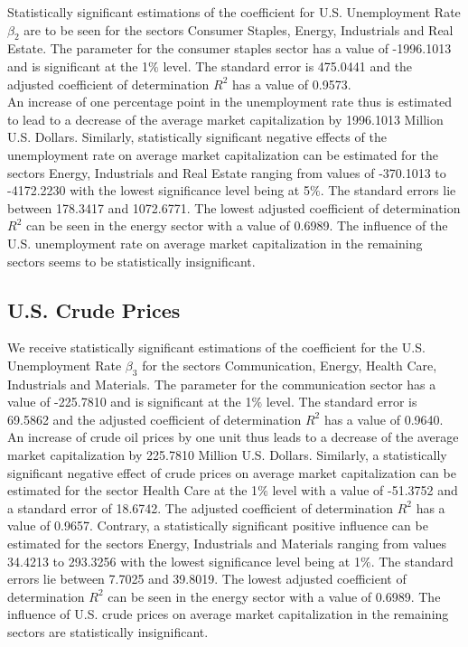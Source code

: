 \documentclass[a4paper,12pt]{article}
\begin{document}
Statistically significant estimations of the coefficient for U.S. Unemployment Rate $\beta_2$ are to be seen for the sectors Consumer Staples, Energy, Industrials and Real Estate. The parameter for the consumer staples sector has a value of -1996.1013 and is significant at the 1$\%$ level. The standard error is 475.0441 and the adjusted coefficient of determination ${R}^2$ has a value of 0.9573.\\ An increase of one percentage point in the unemployment rate thus is estimated to lead to a decrease of the average market capitalization by 1996.1013 Million U.S. Dollars. Similarly, statistically significant negative effects of the unemployment rate on average market capitalization can be estimated for the sectors Energy, Industrials and Real Estate ranging from values of -370.1013 to -4172.2230 with the lowest significance level being at 5$\%$. The standard errors lie between 178.3417 and 1072.6771. The lowest adjusted coefficient of determination ${R}^2$ can be seen in the energy sector with a value of 0.6989. The influence of the U.S. unemployment rate on average market capitalization in the remaining sectors seems to be statistically insignificant.

\subsection{U.S. Crude Prices}

We receive statistically significant estimations of the coefficient for the U.S. Unemployment Rate $\beta_3$ for the sectors Communication, Energy, Health Care, Industrials and Materials. The parameter for the communication sector has a value of -225.7810 and is significant at the 1$\%$ level. The standard error is 69.5862 and the adjusted coefficient of determination ${R}^2$ has a value of 0.9640. An increase of crude oil prices by one unit thus leads to a decrease of the average market capitalization by 225.7810 Million U.S. Dollars. Similarly, a statistically significant negative effect of crude prices on average market capitalization can be estimated for the sector Health Care at the 1$\%$ level with a value of -51.3752 and a standard error of 18.6742. The adjusted coefficient of determination ${R}^2$ has a value of 0.9657. Contrary, a statistically significant positive influence can be estimated for the sectors Energy, Industrials and Materials ranging from values 34.4213 to 293.3256 with the lowest significance level being at 1$\%$. The standard errors lie between 7.7025 and 39.8019. The lowest adjusted coefficient of determination ${R}^2$ can be seen in the energy sector with a value of 0.6989. The influence of U.S. crude prices on average market capitalization in the remaining sectors are statistically insignificant.
\end{document}
